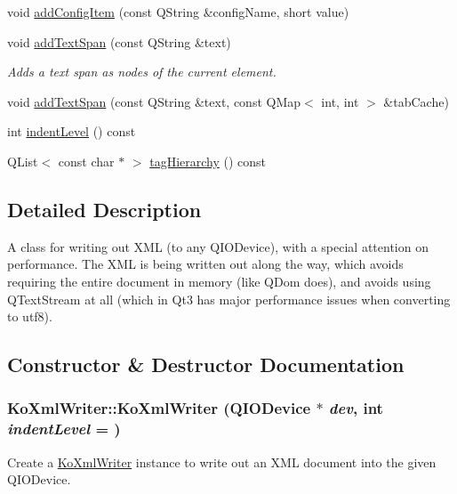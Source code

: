 \begin{DoxyCompactItemize}
\item 
void \hyperlink{classKoXmlWriter_a517c0ff99e13b5f20df48b9b49bffcca}{addConfigItem} (const QString \&configName, short value)
\item 
void \hyperlink{classKoXmlWriter_ac22324a2b86a2d5ed20026d9a47f353f}{addTextSpan} (const QString \&text)
\begin{DoxyCompactList}\small\item\em Adds a text span as nodes of the current element. \item\end{DoxyCompactList}\item 
void \hyperlink{classKoXmlWriter_a609b2173ad0698a2f6f7a9b50beb5f0d}{addTextSpan} (const QString \&text, const QMap$<$ int, int $>$ \&tabCache)
\item 
int \hyperlink{classKoXmlWriter_a71173772ef00a18d725d861cd409c0ad}{indentLevel} () const 
\item 
QList$<$ const char $\ast$ $>$ \hyperlink{classKoXmlWriter_a9b3c63f244bbf41882ea76215b1be287}{tagHierarchy} () const 
\end{DoxyCompactItemize}


\subsection{Detailed Description}
A class for writing out XML (to any QIODevice), with a special attention on performance. The XML is being written out along the way, which avoids requiring the entire document in memory (like QDom does), and avoids using QTextStream at all (which in Qt3 has major performance issues when converting to utf8). 

\subsection{Constructor \& Destructor Documentation}
\hypertarget{classKoXmlWriter_a533f9617e577fd34b4a4c7ad9fe23255}{
\subsubsection[{KoXmlWriter}]{\setlength{\rightskip}{0pt plus 5cm}KoXmlWriter::KoXmlWriter (QIODevice $\ast$ {\em dev}, \/  int {\em indentLevel} = {})}}
\label{classKoXmlWriter_a533f9617e577fd34b4a4c7ad9fe23255}
Create a \hyperlink{classKoXmlWriter}{KoXmlWriter} instance to write out an XML document into the given QIODevice. 

